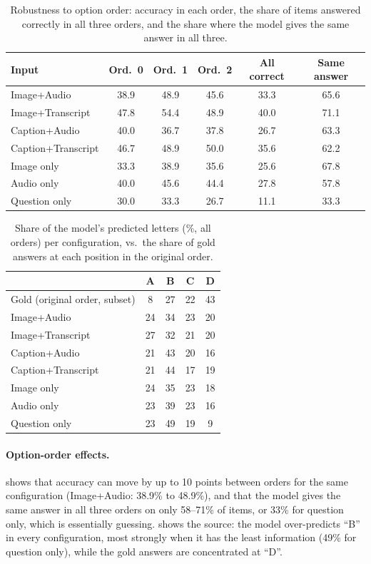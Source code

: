 \begin{table}[h]
\caption{Robustness to option order: accuracy in each order, the share of items answered correctly in
all three orders, and the share where the model gives the same answer in all three.}
\label{tab:app-perm}
\centering\small
\setlength{\tabcolsep}{3.5pt}
\begin{tabular}{lccccc}
\toprule
Input & Ord.\ 0 & Ord.\ 1 & Ord.\ 2 & All correct & Same answer \\
\midrule
Image+Audio        & 38.9 & 48.9 & 45.6 & 33.3 & 65.6 \\
Image+Transcript   & 47.8 & 54.4 & 48.9 & 40.0 & 71.1 \\
Caption+Audio      & 40.0 & 36.7 & 37.8 & 26.7 & 63.3 \\
Caption+Transcript & 46.7 & 48.9 & 50.0 & 35.6 & 62.2 \\
Image only         & 33.3 & 38.9 & 35.6 & 25.6 & 67.8 \\
Audio only         & 40.0 & 45.6 & 44.4 & 27.8 & 57.8 \\
Question only      & 30.0 & 33.3 & 26.7 & 11.1 & 33.3 \\
\bottomrule
\end{tabular}
\end{table}

\begin{table}[h]
\caption{Share of the model's predicted letters (\%, all orders) per configuration, vs.\ the share of
gold answers at each position in the original order.}
\label{tab:app-letters}
\centering\small
\begin{tabular}{lcccc}
\toprule
 & A & B & C & D \\
\midrule
Gold (original order, subset) & 8 & 27 & 22 & 43 \\
\midrule
Image+Audio        & 24 & 34 & 23 & 20 \\
Image+Transcript   & 27 & 32 & 21 & 20 \\
Caption+Audio      & 21 & 43 & 20 & 16 \\
Caption+Transcript & 21 & 44 & 17 & 19 \\
Image only         & 24 & 35 & 23 & 18 \\
Audio only         & 23 & 39 & 23 & 16 \\
Question only      & 23 & 49 & 19 &  9 \\
\bottomrule
\end{tabular}
\end{table}

\paragraph{Option-order effects.}  shows that accuracy can
move by up to 10 points between orders for the same configuration (Image+Audio:
38.9\% to 48.9\%), and that the model gives the same answer in all three orders
on only 58--71\% of items, or 33\% for question only, which is essentially guessing.
 shows the source: the model over-predicts ``B'' in every
configuration, most strongly when it has the least information (49\% for question
only), while the gold answers are concentrated at ``D''.

